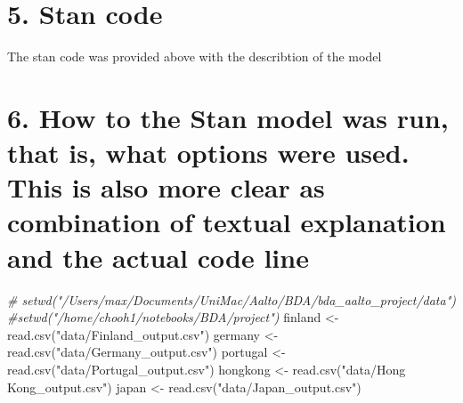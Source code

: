 \documentclass[
]{article}
\newenvironment{Shaded}{\begin{snugshade}}{\end{snugshade}}
\newcommand{\CommentTok}[1]{\textcolor[rgb]{0.56,0.35,0.01}{\textit{#1}}}
\newcommand{\FunctionTok}[1]{\textcolor[rgb]{0.00,0.00,0.00}{#1}}
\newcommand{\NormalTok}[1]{#1}
\newcommand{\OtherTok}[1]{\textcolor[rgb]{0.56,0.35,0.01}{#1}}
\newcommand{\StringTok}[1]{\textcolor[rgb]{0.31,0.60,0.02}{#1}}
\begin{document}
\newpage

\hypertarget{stan-code}{%
\section{5. Stan code}\label{stan-code}}

The stan code was provided above with the describtion of the model

\newpage

\hypertarget{how-to-the-stan-model-was-run-that-is-what-options-were-used.-this-is-also-more-clear-as-combination-of-textual-explanation-and-the-actual-code-line}{%
\section{6. How to the Stan model was run, that is, what options were
used. This is also more clear as combination of textual explanation and
the actual code
line}\label{how-to-the-stan-model-was-run-that-is-what-options-were-used.-this-is-also-more-clear-as-combination-of-textual-explanation-and-the-actual-code-line}}

\begin{Shaded}
\begin{Highlighting}[]
\CommentTok{\# setwd("/Users/max/Documents/UniMac/Aalto/BDA/bda\_aalto\_project/data")}
\CommentTok{\#setwd("/home/chooh1/notebooks/BDA/project")}
\NormalTok{finland }\OtherTok{\textless{}{-}} \FunctionTok{read.csv}\NormalTok{(}\StringTok{"data/Finland\_output.csv"}\NormalTok{)}
\NormalTok{germany }\OtherTok{\textless{}{-}} \FunctionTok{read.csv}\NormalTok{(}\StringTok{"data/Germany\_output.csv"}\NormalTok{)}
\NormalTok{portugal }\OtherTok{\textless{}{-}} \FunctionTok{read.csv}\NormalTok{(}\StringTok{"data/Portugal\_output.csv"}\NormalTok{)}
\NormalTok{hongkong }\OtherTok{\textless{}{-}} \FunctionTok{read.csv}\NormalTok{(}\StringTok{"data/Hong Kong\_output.csv"}\NormalTok{)}
\NormalTok{japan }\OtherTok{\textless{}{-}} \FunctionTok{read.csv}\NormalTok{(}\StringTok{"data/Japan\_output.csv"}\NormalTok{)}
\end{Highlighting}
\end{Shaded}
\end{document}
